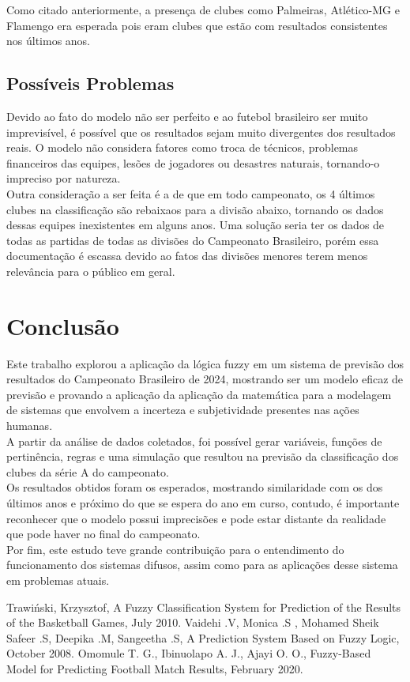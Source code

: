 \documentclass[conference]{IEEEtran}
\begin{document}
\indent Como citado anteriormente, a presença de clubes como Palmeiras, 
Atlético-MG e Flamengo era esperada pois eram clubes que estão com resultados 
consistentes nos últimos anos.

\subsection{Possíveis Problemas}
\indent Devido ao fato do modelo não ser perfeito e ao futebol brasileiro ser 
muito imprevisível, é possível que os resultados sejam muito divergentes dos 
resultados reais. O modelo não considera fatores como troca de técnicos, 
problemas financeiros das equipes, lesões de jogadores ou desastres naturais, 
tornando-o impreciso por natureza.\\
\indent Outra consideração a ser feita é a de que em todo campeonato, os 4 últimos 
clubes na classificação são rebaixaos para a divisão abaixo, tornando os dados 
dessas equipes inexistentes em alguns anos. Uma solução seria ter os dados de 
todas as partidas de todas as divisões do Campeonato Brasileiro, porém essa 
documentação é escassa devido ao fatos das divisões menores terem menos 
relevância para o público em geral.

\section{Conclusão}
\indent Este trabalho explorou a aplicação da lógica fuzzy em um sistema de 
previsão dos resultados do Campeonato Brasileiro de 2024, mostrando ser um modelo 
eficaz de previsão e provando a aplicação da aplicação da matemática para a 
modelagem de sistemas que envolvem a incerteza e subjetividade presentes nas 
ações humanas.\\
\indent A partir da análise de dados coletados, foi possível gerar variáveis, 
funções de pertinência, regras e uma simulação que resultou na previsão da 
classificação dos clubes da série A do campeonato.\\
\indent Os resultados obtidos foram os esperados, mostrando similaridade com 
os dos últimos anos e próximo do que se espera do ano em curso, contudo, é 
importante reconhecer que o modelo possui imprecisões e pode estar distante da 
realidade que pode haver no final do campeonato.\\
\indent Por fim, este estudo teve grande contribuição para o entendimento do 
funcionamento dos sistemas difusos, assim como para as aplicações desse sistema 
em problemas atuais.

\begin{thebibliography}{00}
 Trawiński, Krzysztof, A Fuzzy Classification System for Prediction of the Results of the
Basketball Games, July 2010.
 Vaidehi .V, Monica .S , Mohamed Sheik Safeer .S, Deepika .M, Sangeetha .S, A Prediction System Based on Fuzzy Logic, October 2008.
 Omomule T. G., Ibinuolapo A. J., Ajayi O. O., Fuzzy-Based Model for Predicting Football Match Results, February 2020.
\end{thebibliography}
\end{document}
